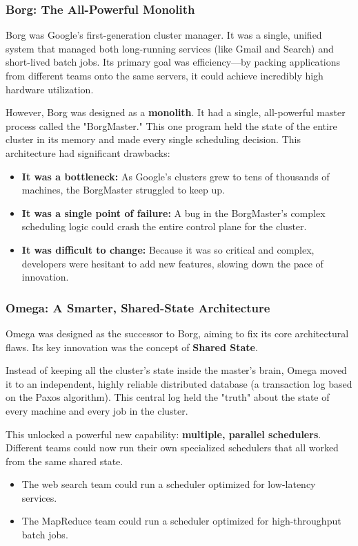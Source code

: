 \subsubsection{\textbf{Borg: The All-Powerful Monolith}}


Borg was Google's first-generation cluster manager. It was a single, unified system that managed both long-running services (like Gmail and Search) and short-lived batch jobs. Its primary goal was efficiency---by packing applications from different teams onto the same servers, it could achieve incredibly high hardware utilization.

However, Borg was designed as a \textbf{monolith}. It had a single, all-powerful master process called the "BorgMaster." This one program held the state of the entire cluster in its memory and made every single scheduling decision. This architecture had significant drawbacks:
\begin{itemize}
\item \textbf{It was a bottleneck:} As Google's clusters grew to tens of thousands of machines, the BorgMaster struggled to keep up.
\item \textbf{It was a single point of failure:} A bug in the BorgMaster's complex scheduling logic could crash the entire control plane for the cluster.
\item \textbf{It was difficult to change:} Because it was so critical and complex, developers were hesitant to add new features, slowing down the pace of innovation.
\end{itemize}

\subsubsection{\textbf{Omega: A Smarter, Shared-State Architecture}}


Omega was designed as the successor to Borg, aiming to fix its core architectural flaws. Its key innovation was the concept of \textbf{Shared State}.

Instead of keeping all the cluster's state inside the master's brain, Omega moved it to an independent, highly reliable distributed database (a transaction log based on the Paxos algorithm). This central log held the "truth" about the state of every machine and every job in the cluster.

This unlocked a powerful new capability: \textbf{multiple, parallel schedulers}. Different teams could now run their own specialized schedulers that all worked from the same shared state.
\begin{itemize}
\item The web search team could run a scheduler optimized for low-latency services.
\item The MapReduce team could run a scheduler optimized for high-throughput batch jobs.
\end{itemize}

